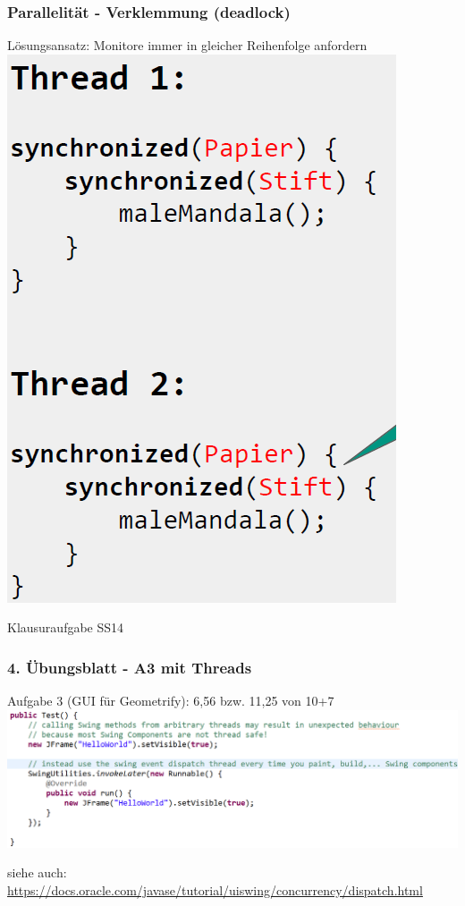 \documentclass[18pt]{beamer}
\begin{document}
	
	\begin{frame}
		\frametitle{Parallelität - Verklemmung (deadlock)}
		\centering Lösungsansatz: Monitore immer in gleicher Reihenfolge anfordern \linebreak
		\includegraphics[scale=0.4]{./pics/tut5/deadlock-ex-sol.png}
	\end{frame}
	
	\begin{frame}
		\centering
		\begin{huge}
			Klausuraufgabe SS14
		\end{huge}
	\end{frame}
	
	
	\begin{frame}
		\frametitle{4. Übungsblatt - A3 mit Threads}
		\begin{block}{Aufgabe 3 (GUI für Geometrify): 6,56 bzw. 11,25 von 10+7} 
			\includegraphics[scale=0.34]{./pics/tut5/edt.png}
		\end{block}
		\begin{tiny}
			siehe auch: \url{https://docs.oracle.com/javase/tutorial/uiswing/concurrency/dispatch.html}
		\end{tiny}
	\end{frame}
\end{document}
